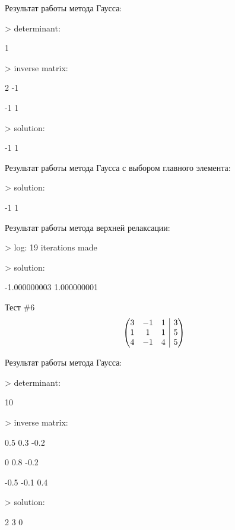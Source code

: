 \documentclass[12pt, a4paper]{report}
\makeatletter
\newenvironment{amatrix}[1]{%
        \left(\begin{array}{@{}*{#1}{c}|c@{}}
}{%
        \end{array}\right)
}
\makeatother
\begin{document}
{\normalsize{Результат работы метода Гаусса: \par}
\normalsize{> determinant: \par
            1 \par
            > inverse matrix: \par
                         2              -1 \par
                        -1               1 \par
            > solution: \par
                        -1               1 \par}
\vspace{0.25cm}
\normalsize{Результат работы метода Гаусса с выбором главного элемента: \par}
\normalsize{> solution: \par
            -1              1 \par}
\vspace{0.25cm}
\normalsize{Результат работы метода верхней релаксации: \par}
\normalsize{> log: 19 iterations made \par
            > solution: \par
            -1.000000003     1.000000001 \par}
\vspace{1cm}

\large{Тест \#6}
\[\begin{amatrix}{3}
        3 & -1 &  1 & 3 \\
        1 &  1 &  1 & 5 \\
        4 & -1 &  4 & 5 \\
\end{amatrix}\]

\normalsize{Результат работы метода Гаусса: \par}
\normalsize{> determinant: \par
            10 \par
            > inverse matrix: \par
                       0.5             0.3            -0.2 \par
                         0             0.8            -0.2 \par
                      -0.5            -0.1             0.4 \par
            > solution: \par
                         2               3               0 \par}

}
\end{document}
